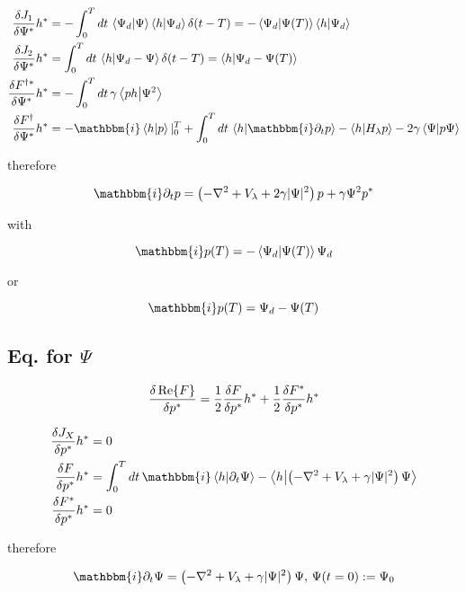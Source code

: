 \documentclass[10pt,a4paper]{article}
\newcommand{\iu}{\ensuremath{\mathbbm{i}}}
\newcommand{\intT}{\ensuremath{\int_0^T dt\,}}
\newcommand{\Hlam}{\ensuremath{H_{\lambda}}}
\begin{document}
\begin{align}
\fdv{J_1}{\Psi^*} h^* &= -\intT \braket{\Psi_d}{\Psi}\braket{h}{\Psi_d} \delta(t-T) = -\braket{\Psi_d}{\Psi(T)}\braket{h}{\Psi_d} \\
\fdv{J_2}{\Psi^*} h^* &= \intT \braket{h}{\Psi_d-\Psi} \delta(t-T) = \braket{h}{\Psi_d-\Psi(T)} \\
\fdv{F^{\dagger*}}{\Psi^*} h^* &= -\intT\gamma \braket{p h}{\Psi^2} \\
\fdv{F^{\dagger}}{\Psi^*} h^* &= -\iu \braket{h}{p}\vert_{0}^{T} + \intT \braket{h}{\iu \partial_t p} - \braket{h}{\Hlam p} - 2 \gamma \braket{\Psi}{ p \Psi}
\end{align}

therefore

\begin{equation}
\iu \partial_t p = \left( -\laplacian + V_{\lambda} + 2 \gamma \vert \Psi \vert^2 \right) p + \gamma \Psi^2 p^*
\end{equation}

with 

\begin{equation}
\iu p(T) = -\braket{\Psi_d}{\Psi(T)} \Psi_d
\end{equation}

or

\begin{equation}
\iu p(T) = \Psi_d - \Psi(T)
\end{equation}

\subsection{Eq. for $\Psi$}

\begin{equation}
\fdv{\Re{F}}{p^*} = \frac{1}{2} \fdv{F}{p^*} h^* + \frac{1}{2} \fdv{F^*}{p^*} h^*
\end{equation}

\begin{align}
\fdv{J_X}{p^*} h^* &= 0 \\
\fdv{F}{p^*} h^* &= \intT \iu \braket{h}{\partial_t\Psi} - \braket{h}{\left( -\laplacian + V_{\lambda} + \gamma \vert \Psi \vert^2 \right)\Psi} \\
\fdv{F^*}{p^*} h^* &= 0
\end{align}

therefore

\begin{equation}
\iu \partial_t\Psi = \left( -\laplacian + V_{\lambda} + \gamma \vert \Psi \vert^2 \right)\Psi, \, \Psi(t=0):=\Psi_0
\end{equation}
\end{document}
